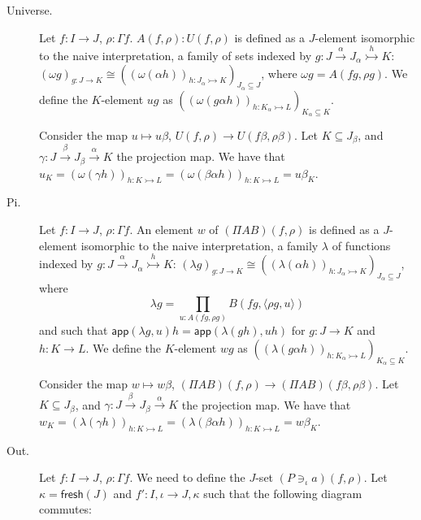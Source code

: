 \documentclass[english]{PaperTools/latex/lipics}
\newcommand\op[1]{∋_{#1}}
\def\fresh#1{\mathsf{fresh}(#1)}
\def\ie{\textit{i.e.}}
\def\app#1#2{\mathsf{app}(#1,#2)}
\begin{document}
\bigskip
\begin{description}
  \item[\sc Universe.]
    Let $f : I → J$, $ρ : Γf$.  $A(f,ρ) : U(f,ρ)$ is
    defined as a $J$-element isomorphic to the naive interpretation,
    a family of sets indexed by
    $g : J \stackrel{α}{→} J_α \stackrel {h}{↣} K$:
    $\left(ωg\right)_{g : J → K} ≅ \left(\left(ω(αh)\right)_{h : J_α ↣ K}\right)_{J_α ⊆ J}$,
    where $ωg = A(fg,ρg)$.
    We define the $K$-element $u g$ as
    $\left(\left(ω(gαh)\right)_{h : K_α ↣ L}\right)_{K_α ⊆ K}$.

    Consider the map $u ↦ uβ$, $U(f,ρ) → U(fβ,ρβ)$.  Let
    $K ⊆ J_β$, and $γ : J \stackrel{β}{→} J_β \stackrel{α}{→} K$ the projection map.
    We have that
    $u_K = \left(ω(γh)\right)_{h : K ↣ L}
         = \left(ω(βαh)\right)_{h : K ↣ L}
         = uβ_K$.

  \item[\sc Pi.]
    Let $f : I → J$, $ρ : Γf$.  An element $w$ of $(Π A B)(f,ρ)$ is
    defined as a $J$-element isomorphic to the naive interpretation, a
    family $λ$ of functions indexed by
    $g : J \stackrel{α}{→} J_α \stackrel {h}{↣} K$:
    $\left(λg\right)_{g : J → K} ≅ \left(\left(λ(αh)\right)_{h : J_α ↣ K}\right)_{J_α ⊆ J}$,
    where
    $$λ g = \prod_{u : A(fg,ρg)} B(fg,⟨ρg,u⟩) $$
    and such that
    $\app{λg} u h = \app{λ(gh)}{uh}$ for $g : J → K$ and $h : K → L$.
    We define the $K$-element $w g$ as
    $\left(\left(λ(gαh)\right)_{h : K_α ↣ L}\right)_{K_α ⊆ K}$.

    Consider the map $w ↦ wβ$, $(Π A B)(f,ρ) → (Π A B)(fβ,ρβ)$.  Let
    $K ⊆ J_β$, and $γ : J \stackrel{β}{→} J_β \stackrel{α}{→} K$ the projection map.
    We have that
    $w_K = \left(λ(γh)\right)_{h : K ↣ L}
         = \left(λ(βαh)\right)_{h : K ↣ L}
         = wβ_K$.


  \item[\sc Out.]
    Let $f : I → J$, $ρ : Γf$.  We need to define the $J$-set $(P \op {ι} a)(f,ρ)$.
    Let $κ = \fresh J$ and $f' : I,ι → J,κ$ such that the following
    diagram commutes:


\end{description}
\end{document}
